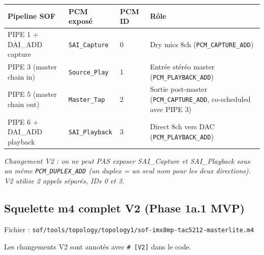 \documentclass[11pt,a4paper]{article}
\begin{document}
\begin{center}
\begin{tabularx}{\textwidth}{lllX}
\toprule
\textbf{Pipeline SOF} & \textbf{PCM exposé} & \textbf{PCM ID} & \textbf{Rôle} \\
\midrule
PIPE 1 + DAI\_ADD capture & \texttt{SAI\_Capture} & 0 & Dry mics 8ch (\texttt{PCM\_CAPTURE\_ADD}) \\
PIPE 3 (master chain in) & \texttt{Source\_Play} & 1 & Entrée stéréo master (\texttt{PCM\_PLAYBACK\_ADD}) \\
PIPE 5 (master chain out) & \texttt{Master\_Tap} & 2 & Sortie post-master (\texttt{PCM\_CAPTURE\_ADD}, co-scheduled avec PIPE 3) \\
PIPE 6 + DAI\_ADD playback & \texttt{SAI\_Playback} & 3 & Direct 8ch vers DAC (\texttt{PCM\_PLAYBACK\_ADD}) \\
\bottomrule
\end{tabularx}
\end{center}

\textit{\small Changement V2 : on ne peut PAS exposer SAI\_Capture et SAI\_Playback sous un même \texttt{PCM\_DUPLEX\_ADD} (un duplex = un seul nom pour les deux directions). V2 utilise 2 appels séparés, IDs 0 et 3.}

\subsection{Squelette m4 complet V2 (Phase 1a.1 MVP)}

Fichier : \texttt{sof/tools/topology/topology1/sof-imx8mp-tac5212-masterlite.m4}

Les changements V2 sont annotés avec \texttt{\# [V2]} dans le code.
\end{document}
